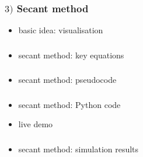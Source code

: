 \documentclass[english,14pt]{beamer}
\begin{document}

\begin{frame}[fragile]

\frametitle{$3)$ Secant method}

\begin{itemize}
	\item basic idea: visualisation
\end{itemize}

\end{frame}


\begin{frame}[fragile]

\frametitle{}

\begin{itemize}
	\item secant method: key equations
\end{itemize}

\end{frame}


\begin{frame}[fragile]

\frametitle{}

\begin{itemize}
	\item secant method: pseudocode
\end{itemize}

\end{frame}


\begin{frame}[fragile]

\frametitle{}

\begin{itemize}
	\item secant method: Python code
	\item live demo
\end{itemize}

\end{frame}


\begin{frame}[fragile]

\frametitle{}

\begin{itemize}
	\item secant method: simulation results
\end{itemize}

\end{frame}
\end{document}
